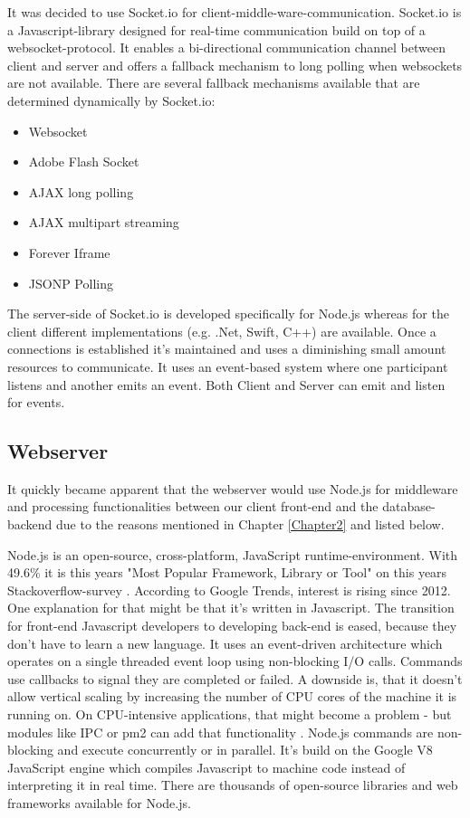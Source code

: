 It was decided to use Socket.io for client-middle-ware-communication.
Socket.io is a Javascript-library designed for real-time communication build on top of a websocket-protocol.
It enables a bi-directional communication channel between client and server and offers a fallback mechanism to long polling when websockets are not available.
There are several fallback mechanisms available that are determined dynamically by Socket.io:
\begin{itemize}
    \item Websocket
    \item Adobe Flash Socket
    \item AJAX long polling
    \item AJAX multipart streaming
    \item Forever Iframe
    \item JSONP Polling
\end{itemize}

The server-side of Socket.io is developed  specifically for Node.js whereas for the client different implementations (e.g. .Net, Swift, C++)\parencite{socketioClients} are available.
Once a connections is established it's maintained and uses a diminishing small amount resources to communicate. 
It uses an event-based system where one participant listens and another emits an event. 
Both Client and Server can emit and listen for events.

\subsection{Webserver}
It quickly became apparent that the webserver would use Node.js for middleware and processing functionalities between our client front-end and the \- database-backend 
due to the reasons mentioned in Chapter \ref{Chapter2} and listed below.

Node.js is an open-source, cross-platform, JavaScript \- runtime-environment. 
With 49.6\% it is this years "Most Popular Framework, Library or Tool" on this years Stackoverflow-survey \parencite{stackOverflowSurvey}.
According to Google Trends, interest is rising since 2012\parencite{gogleTrendNode}.
One explanation for that might be that it's written in Javascript. 
The transition for front-end Javascript developers to developing back-end is eased, because they don't have to learn a new language.
It uses an event-driven architecture which operates on a single threaded event loop using non-blocking I/O calls.
Commands use callbacks to signal they are completed or failed. 
A downside is, that it doesn't allow vertical scaling by increasing the number of CPU cores of the machine it is running on. 
On CPU-intensive applications, that might become a problem - but modules like IPC or pm2 can add that functionality \parencite{pm2}.
Node.js commands are non-blocking and execute concurrently or in parallel. 
It's build on the Google V8 JavaScript engine which compiles Javascript to machine code instead of interpreting it in real time. 
There are thousands of open-source libraries and web frameworks available for Node.js. 

